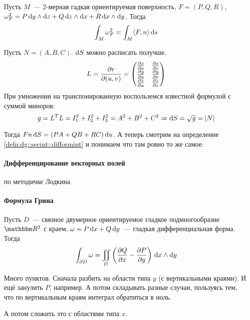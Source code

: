 \documentclass[12pt,draft,timbord]{longnotes}
\begin{document}
\def\wdgcoef#1#2#3{#1\, \del #2 \wedge \del #3}
\begin{prop}\label{prop:dg::secint::surfdiffform}
  Пусть $M$~--- 2-мерная гадкая ориентируемая поверхность, $F=(P,Q,R)$,
  $\omega_F^2 = \wdgcoef{P}{y}{z} + \wdgcoef{Q}{z}{x} + \wdgcoef{R}{x}{y} $. Тогда \[
    \int_M \omega_F^2 = \int_M  \langle F,n  \rangle\, \mathrm{d} s
  \]
\end{prop}
\begin{lproof}
  \def\arraystretch{1.5}
  Пусть $N = (A,B,C)$. $\mathrm{d} S$ можно расписать получше.
  \[
    L = \frac{\partial r}{\partial (u,v)} = 
    \begin{pmatrix}
      \frac{\partial x}{\partial u} & \frac{\partial x}{\partial v} \\
      \frac{\partial y}{\partial u} & \frac{\partial y}{\partial v} \\
      \frac{\partial z}{\partial u} & \frac{\partial z}{\partial v} 
    \end{pmatrix}
  \]
  При умножении на транспонированную воспольземся известной формулой с суммой миноров:
  \[
    g = L^T L = I_1^2 + I_2^2 + I_3^2 = A^2 + B^2 + C^2 \Rightarrow \mathrm{d} S = \sqrt{g} = |N|
  \]

  Тогда $F n\, \mathrm{d} S = (PA+QB+RC) \, \mathrm{d} u$. А теперь смотрим на определение \ref{defn:dg::secint::difformint} 
  и понимаем что там ровно то же самое.
\end{lproof}


\paragraph{Дифференцирование векторных полей}
\label{par:dg::vecfione}

по методичке Лодкина

\paragraph{Формула Грина}
\label{par:dg::green}

\begin{thrm}\label{thrm:dg::green}
  Пусть $D$~--- связное двумерное ориентируемое гладкое подмногообразие $\R^2$ с краем,
  $\omega = P \, \mathrm{d} x + Q\, \mathrm{d} y$~--- гладкая дифференциальная форма.
  Тогда
  \[
    \int_{\partial D} \omega = \iint _D \left(\frac{\partial Q}{\partial x} - \frac{\partial P}{\partial y}\right) \, \mathrm{d} x\wedge \mathrm{d} y
  \]
\end{thrm}

\begin{tproof}
  Много пунктов. Сначала разбить на области типа $y$ (с вертикальными краями). 
  И ещё занулить $P$, например.  А потом складывать разные случаи, пользуясь тем, что
  по вертикальным краям интеграл обратиться в ноль.
  
  А потом сложить это с областями типа $x$.
\end{tproof}
\end{document}
